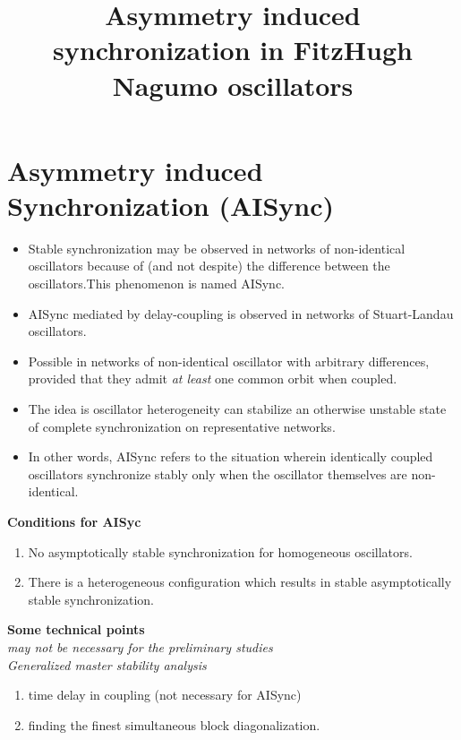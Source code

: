 \documentclass[12pt,a4paper,final]{article}
\date{}
\title{Asymmetry induced synchronization in FitzHugh Nagumo oscillators}
\begin{document}
    \maketitle
\section*{Asymmetry induced Synchronization (AISync)}
\begin{itemize}
    \item Stable synchronization may be observed in networks of non-identical 
    oscillators because of (and not despite) the difference between the 
    oscillators.This phenomenon is named AISync.
    \item AISync mediated by delay-coupling is observed in networks of 
    Stuart-Landau oscillators.
    \item  Possible in networks of non-identical oscillator with arbitrary 
    differences, provided that they admit {\it at least} one common orbit when 
    coupled.
    \item The idea is oscillator heterogeneity can stabilize an otherwise 
    unstable state of complete synchronization on representative networks.
    \item In other words, AISync refers to the situation wherein identically 
    coupled oscillators synchronize stably only when the oscillator themselves 
    are non-identical.
\end{itemize}

\noindent \textbf{Conditions for AISyc}
	\begin{enumerate}[label=(\Alph*)]
		\item No asymptotically stable synchronization for homogeneous oscillators. 
		
		\item There is a heterogeneous configuration which results in stable asymptotically stable synchronization. 
	\end{enumerate}

\noindent \textbf{Some technical points}\\
{\it may not be necessary for the preliminary studies}\\
{\it Generalized master stability analysis}

\begin{enumerate}[label=(\alph*)]
	\item time delay in coupling (not necessary for AISync)
	\item finding the finest simultaneous block diagonalization.
\end{enumerate}
\end{document}
